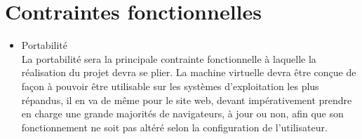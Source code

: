 \section{Contraintes fonctionnelles}
\begin{itemize}
\item Portabilité\\
La portabilité sera la principale contrainte fonctionnelle à laquelle la réalisation du projet devra se plier. La machine virtuelle devra être conçue de façon à pouvoir être utilisable sur les systèmes d'exploitation les plus répandus, il en va de même pour le site web, devant impérativement prendre en charge une grande majorités de navigateurs, à jour ou non, afin que son fonctionnement ne soit pas altéré selon la configuration de l’utilisateur.
\end{itemize}

